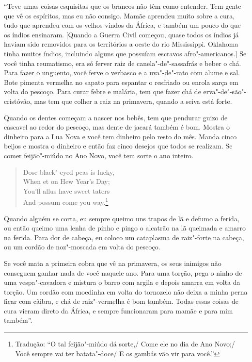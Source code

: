``Teve umas coisas esquisitas que os brancos não têm como entender. Tem
gente que vê os espíritos, mas eu não consigo. Mamãe aprendeu muito
sobre a cura, tudo que aprendeu com os velhos vindos da África, e também
um pouco do que os índios ensinaram. {[}Quando a Guerra Civil começou,
quase todos os índios já haviam sido removidos para os territórios a
oeste do rio Mississippi. Oklahoma tinha muitos índios, incluindo alguns
que possuíam escravos afro"-americanos.{]} Se você tinha reumatismo, era
só ferver raiz de canela"-de"-sassafrás e beber o chá. Para fazer o
unguento, você ferve o verbasco e a uva"-de"-rato com alume e sal. Bote
pimenta vermelha no sapato para espantar o resfriado ou enrola sarça em
volta do pescoço. Para curar febre e malária, tem que fazer chá de
erva"-de"-são"-cristóvão, mas tem que colher a raiz na primavera, quando a
seiva está forte.

Quando os dentes começam a nascer nos bebês, tem que pendurar guizo de
cascavel ao redor do pescoço, mas dente de jacará também é bom. Mostra o
dinheiro para a Lua Nova e você tem dinheiro pelo resto do mês. Manda
cinco beijos e mostra o dinheiro e então faz cinco desejos que todos se
realizam. Se comer feijão"-miúdo no Ano Novo, você tem sorte o ano
inteiro.

\begin{verse}
Dose black"-eyed peas is lucky,\\
When et on Hew Year's Day;\\
You'll allus have sweet taters\\ 
And possum come you way.\footnote{Tradução: ``O tal feijão"-miúdo dá sorte,/ Come ele no dia de Ano Novo;/ Você sempre vai ter batata"-doce/ E os gambás vão vir para você.''}
\end{verse}

Quando alguém se corta, eu sempre queimo uns trapos de lã e defumo a
ferida, ou então queimo uma lenha de pinho e pingo o alcatrão na lã
queimada e amarro na ferida. Para dor de cabeça, eu coloco um cataplasma
de raiz"-forte na cabeça, ou um cordão de noz"-moscada em volta do
pescoço.

Se você mata a primeira cobra que vê na primavera, os seus inimigos não
conseguem ganhar nada de você naquele ano. Para uma torção, pega o ninho
de uma vespa"-cavadora e mistura o barro com argila e depois amarra em
volta da torção. Um cordão com moedinha em volta do tornozelo não deixa
a minha perna ficar com cãibra, e chá de raiz"-vermelha é bom também.
Todas essas coisas de cura vieram direto da África, e sempre funcionaram
para mamãe e para mim também''.

